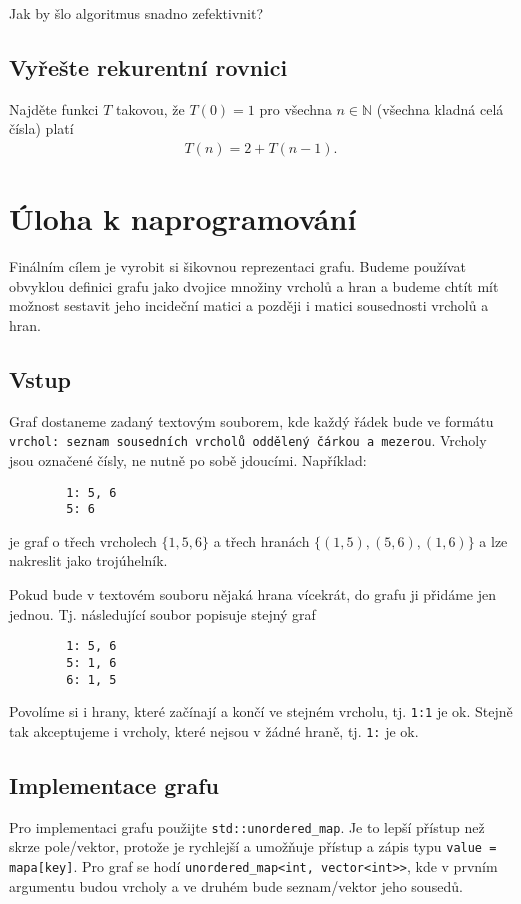 \documentclass[12pt,oneside]{article}
\begin{document}
	Jak by šlo algoritmus snadno zefektivnit?
	
	\subsection{Vyřešte rekurentní rovnici}
	Najděte funkci $T$ takovou, že $T(0) = 1$ pro všechna $n \in \mathbb{N}$ (všechna kladná celá čísla) platí
	\begin{align}
		T(n) = 2 + T(n-1).
	\end{align}
	
	\section{Úloha k naprogramování}
	Finálním cílem je vyrobit si šikovnou reprezentaci grafu.
	Budeme používat obvyklou definici grafu jako dvojice  množiny vrcholů a hran a budeme chtít mít možnost sestavit jeho incideční matici a později i matici sousednosti vrcholů a hran.
	\subsection{Vstup}
	Graf dostaneme zadaný textovým souborem, kde každý řádek bude ve formátu \newline
	\verb|vrchol: seznam sousedních vrcholů oddělený čárkou a mezerou|.
	\newline
	Vrcholy jsou označené čísly, ne nutně po sobě jdoucími.  
	Například:
	\begin{verbatim}
		1: 5, 6
		5: 6
	\end{verbatim}
	je graf o třech vrcholech $\{1, 5, 6\}$ a třech hranách $\{(1, 5), (5, 6), (1, 6)\}$ a lze nakreslit jako trojúhelník.
	
	Pokud bude v textovém souboru nějaká hrana vícekrát, do grafu ji přidáme jen jednou.
	Tj. následující soubor popisuje stejný graf
	\begin{verbatim}
		1: 5, 6
		5: 1, 6
		6: 1, 5
	\end{verbatim}
	Povolíme si i hrany, které začínají a končí ve stejném vrcholu, tj. \verb*|1:1| je ok.
	Stejně tak akceptujeme i vrcholy, které nejsou v žádné hraně, tj. \verb*|1:| je ok.
	
	
	\subsection{Implementace grafu}
	Pro implementaci grafu použijte \verb*|std::unordered_map|. Je to lepší přístup než skrze pole/vektor, protože je rychlejší a umožňuje přístup a zápis typu \verb*|value = mapa[key]|.
	Pro graf se hodí  \verb*|unordered_map<int, vector<int>>|, kde v prvním argumentu budou vrcholy a ve druhém bude seznam/vektor jeho sousedů.
	
\end{document}
